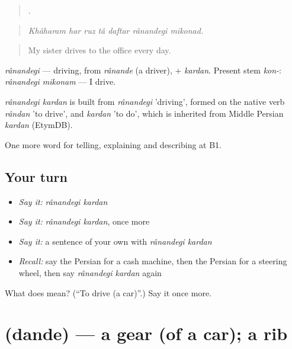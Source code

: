 \begin{quote}
      .
\end{quote}

\begin{quote}
\emph{Khâharam har ruz tâ daftar rânandegi mikonad.}
\end{quote}

\begin{quote}
My sister drives to the office every day.
\end{quote}

\emph{rânandegi} — driving, from \emph{rânande} (a driver), + \emph{kardan}. Present stem \emph{kon-}: \emph{rânandegi mikonam} — I drive.

\begin{cousinweb}
\emph{rânandegi kardan} is built from \emph{rânandegi} 'driving', formed on the native verb \emph{rândan} 'to drive', and \emph{kardan} 'to do', which is inherited from Middle Persian \emph{kardan} (EtymDB).
\end{cousinweb}

\begin{grammarlens}[title={What you've built}]
One more word for telling, explaining and describing at B1.
\end{grammarlens}

\subsection*{Your turn}
\begin{itemize}
\raggedright
  \item \emph{Say it:} \emph{rânandegi kardan}
  \item \emph{Say it:} \emph{rânandegi kardan}, once more
  \item \emph{Say it:} a sentence of your own with \emph{rânandegi kardan}
  \item \emph{Recall:} say the Persian for a cash machine, then the Persian for a steering wheel, then say \emph{rânandegi kardan} again
\end{itemize}

\begin{tcolorbox}[breakable,colback=teal!4,colframe=teal!35!black,title={Before you move on}]
What does   mean? (\textquotedblleft{}To drive (a car)\textquotedblright{}.) Say it once more.
\end{tcolorbox}
\section[\texorpdfstring{\fa{دنده} (dande)}{دنده (dande)}]{ (dande) — a gear (of a car); a rib}

